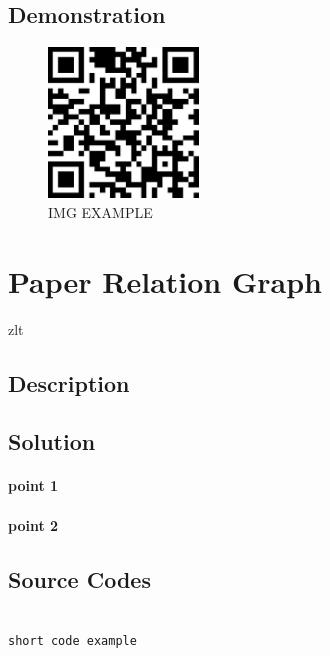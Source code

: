 \documentclass{book}
\begin{document}
\subsection{Demonstration}

\begin{figure}[H]
\centering
\includegraphics[height=4.0cm,width=4.0cm]{img/fsh_1.jpg}
\caption{IMG EXAMPLE}
\end{figure}



\section {Paper Relation Graph}

zlt

\subsection{Description}

\subsection{Solution}

\paragraph{point 1}

\paragraph{point 2}

\subsection{Source Codes}

\begin{minipage}[r]{15em}
\begin{verbatim}

short code example

\end{verbatim}
\end{minipage}
\end{document}
